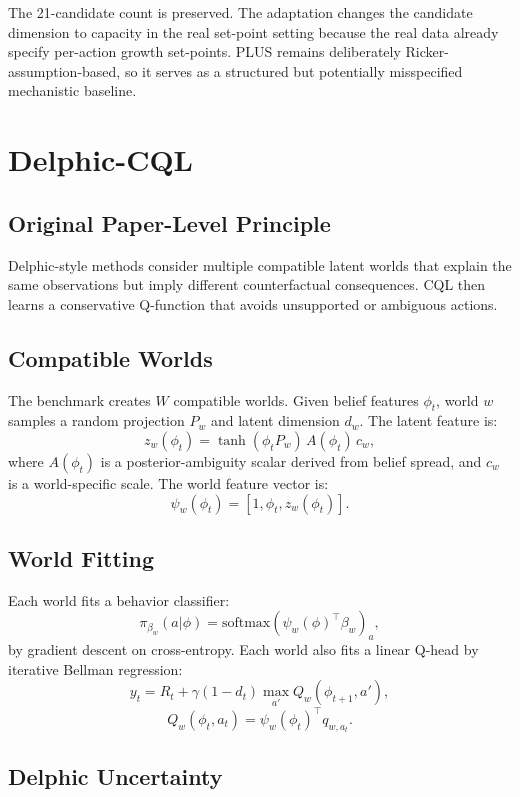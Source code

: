 \documentclass[11pt]{article}
\newcommand{\1}{\mathbf{1}}
\begin{document}
The 21-candidate count is preserved.  The adaptation changes the candidate
dimension to capacity in the real set-point setting because the real data
already specify per-action growth set-points.  PLUS remains deliberately
Ricker-assumption-based, so it serves as a structured but potentially
misspecified mechanistic baseline.

\section{Delphic-CQL}

\subsection{Original Paper-Level Principle}

Delphic-style methods consider multiple compatible latent worlds that explain
the same observations but imply different counterfactual consequences.  CQL
then learns a conservative Q-function that avoids unsupported or ambiguous
actions.

\subsection{Compatible Worlds}

The benchmark creates $W$ compatible worlds.  Given belief features $\phi_t$,
world $w$ samples a random projection $P_w$ and latent dimension $d_w$.  The
latent feature is:
\[
  z_w(\phi_t)
  =
  \tanh(\phi_tP_w)\,
  A(\phi_t)\,
  c_w,
\]
where $A(\phi_t)$ is a posterior-ambiguity scalar derived from belief spread,
and $c_w$ is a world-specific scale.  The world feature vector is:
\[
  \psi_w(\phi_t)=
  [1,\phi_t,z_w(\phi_t)].
\]

\subsection{World Fitting}

Each world fits a behavior classifier:
\[
  \pi_{\beta_w}(a|\phi)
  =
  \mathrm{softmax}(\psi_w(\phi)^\top\beta_w)_a,
\]
by gradient descent on cross-entropy.  Each world also fits a linear Q-head by
iterative Bellman regression:
\[
  y_t = R_t+\gamma(1-d_t)\max_{a'}Q_w(\phi_{t+1},a'),
\]
\[
  Q_w(\phi_t,a_t)=\psi_w(\phi_t)^\top q_{w,a_t}.
\]

\subsection{Delphic Uncertainty}
\end{document}
